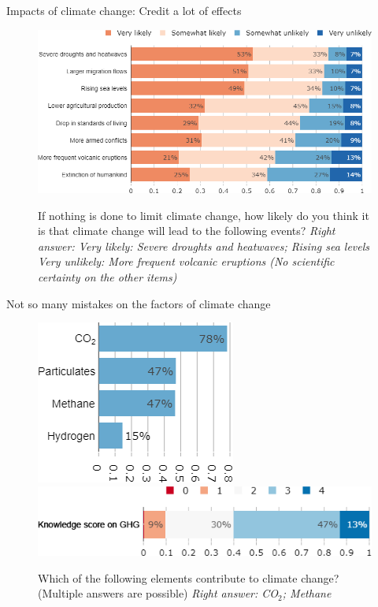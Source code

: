 \begin{framefont}{\small}
\begin{frame}{Impacts of climate change: Credit a lot of effects}%
\begin{figure}[h!]
\centering
\caption{If nothing is done to limit climate change, how likely do you think it is that climate change will lead to the following events?
\newline\footnotesize{\textit{Right answer: Very likely: Severe droughts and heatwaves; Rising sea levels \\ \quad \quad \quad \quad \quad \quad Very unlikely: More frequent volcanic eruptions (No scientific certainty on the other items)}}}
\includegraphics[width=.74\paperwidth]{../figures/FR/CC_impacts_FR.png} \\
\end{figure}
\end{frame}

\begin{frame}{Not so many mistakes on the factors of climate change}%
	\begin{figure}[h!]
	\centering
	\caption{Which of the following elements contribute to climate change? (Multiple answers are possible) \newline \footnotesize{\textit{Right answer: CO$_\text{2}$; Methane}}}
	\centering
	\includegraphics[width=.30\paperwidth]{../figures/FR/GHG_FR.png}
	\vspace{.2cm} \\
	\includegraphics[width=.61\paperwidth]{../figures/FR/score_GHG_FR.png}
	

\end{figure}
\end{frame}
\end{framefont}
